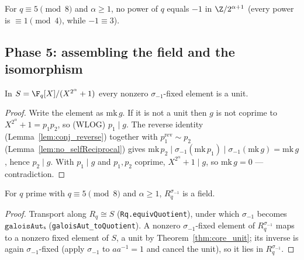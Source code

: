 \begin{lemma}\label{lem:neg_one_notMem}
\leanok
For $q \equiv 5 \pmod 8$ and $\alpha \ge 1$, no power of $q$ equals $-1$ in $\Z/2^{\alpha+1}$ (every
power is $\equiv 1 \pmod 4$, while $-1 \equiv 3$).
\end{lemma}

\subsection{Phase 5: assembling the field and the isomorphism}

\begin{theorem}\label{thm:core_unit}
\leanok
{}
In $S = \F_q[X]/(X^{2^\alpha}+1)$ every nonzero $\sigma_{-1}$-fixed element is a unit.
\end{theorem}

\begin{proof}
Write the element as $\mathrm{mk}\,g$. If it is not a unit then $g$ is not coprime to
$X^{2^\alpha}+1 = p_1 p_2$, so (WLOG) $p_1 \mid g$. The reverse identity (Lemma~\ref{lem:conj_reverse})
together with $p_1^{\mathrm{rev}} \sim p_2$ (Lemma~\ref{lem:no_selfReciprocal}) gives
$\mathrm{mk}\,p_2 \mid \sigma_{-1}(\mathrm{mk}\,p_1) \mid \sigma_{-1}(\mathrm{mk}\,g) = \mathrm{mk}\,g$,
hence $p_2 \mid g$. With $p_1 \mid g$ and $p_1, p_2$ coprime, $X^{2^\alpha}+1 \mid g$, so
$\mathrm{mk}\,g = 0$ --- contradiction.
\end{proof}

\begin{theorem}\label{thm:conjFixedSubring_isField}
\leanok
{}
For $q$ prime with $q \equiv 5 \pmod 8$ and $\alpha \ge 1$, $R_q^{\sigma_{-1}}$ is a field.
\end{theorem}

\begin{proof}
Transport along $R_q \cong S$ (\texttt{Rq.equivQuotient}), under which $\sigma_{-1}$ becomes
$\texttt{galoisAutₛ}$ (\texttt{galoisAut\_toQuotient}). A nonzero $\sigma_{-1}$-fixed element of
$R_q^{\sigma_{-1}}$ maps to a nonzero fixed element of $S$, a unit by
Theorem~\ref{thm:core_unit}; its inverse is again $\sigma_{-1}$-fixed (apply $\sigma_{-1}$ to
$a a^{-1} = 1$ and cancel the unit), so it lies in $R_q^{\sigma_{-1}}$.
\end{proof}


